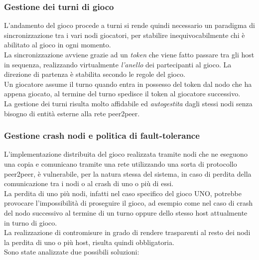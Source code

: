 \documentclass[10pt,a4paper]{article}
\begin{document}
\subsubsection{Gestione dei turni di gioco}
L'andamento del gioco procede a turni si rende quindi necessario un paradigma di sincronizzazione tra i vari nodi giocatori, per stabilire inequivocabilmente chi è abilitato al gioco in ogni momento.\\ La sincronizzazione avviene grazie ad un \textit{token} che viene fatto passare tra gli host in sequenza, realizzando virtualmente \textit{l'anello} dei partecipanti al gioco. La direzione di partenza è stabilita secondo le regole del gioco.\\ Un giocatore assume il turno quando entra in possesso del token dal nodo che ha appena giocato, al termine del turno spedisce il token al giocatore successivo.\\ 
La gestione dei turni risulta molto affidabile ed \textit{autogestita} dagli stessi nodi senza bisogno di entità esterne alla rete peer2peer.

\subsubsection{Gestione crash nodi e politica di fault-tolerance}
L'implementazione distribuita del gioco realizzata tramite nodi che ne eseguono una copia e comunicano tramite una rete utilizzando una sorta di protocollo peer2peer, è vulnerabile, per la natura stessa del sistema, in caso di perdita della comunicazione tra i nodi o al crash di uno o più di essi. \\La perdita di uno più nodi, infatti nel caso specifico del gioco UNO, potrebbe provocare l'impossibilità di proseguire il gioco, ad esempio come nel caso di crash del nodo successivo al termine di un turno oppure dello stesso host attualmente in turno di gioco.\\ La realizzazione di contromisure in grado di rendere trasparenti al resto dei nodi la perdita di uno o più host, risulta quindi obbligatoria. \\ Sono state analizzate due possibili soluzioni:
\end{document}
